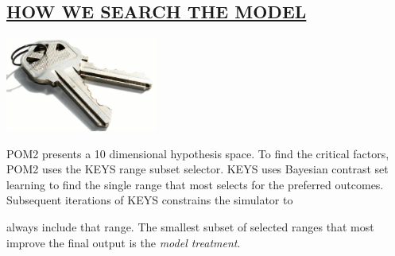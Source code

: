 \begin{kasten}
    \section*{ \hspace{0.1cm} {\color{red} \underline{HOW WE SEARCH THE MODEL}}}
    \vspace{-0.5em}
    \begin{minipage}{5cm}
      \includegraphics[width=5cm]{keys.eps}
    \end{minipage}
    \begin{minipage}{8cm}
      \large{
        POM2 presents a 10 dimensional hypothesis space. To find the critical factors, POM2 uses the KEYS range subset selector. KEYS uses Bayesian contrast set learning to find the single range that most selects for the preferred outcomes. Subsequent iterations of KEYS constrains the simulator to 

      }
    \end{minipage}
    \large{
always include that range. The smallest subset of selected ranges that most improve the final output is the {\em model treatment}.
    }
    \vspace{-0.5em}
\end{kasten}

